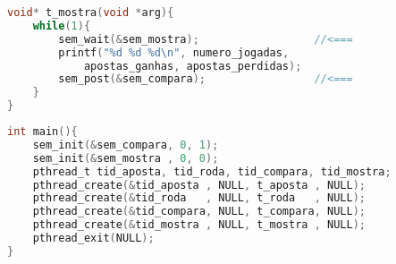 \documentclass{sope}
\begin{document}
\begin{lstlisting}[language=C]
void* t_mostra(void *arg){
    while(1){
        sem_wait(&sem_mostra);                  //<===
        printf("%d %d %d\n", numero_jogadas,
            apostas_ganhas, apostas_perdidas);
        sem_post(&sem_compara);                 //<===
    }
}
\end{lstlisting}
\begin{lstlisting}[language=C]
int main(){
    sem_init(&sem_compara, 0, 1);
    sem_init(&sem_mostra , 0, 0);
    pthread_t tid_aposta, tid_roda, tid_compara, tid_mostra;
    pthread_create(&tid_aposta , NULL, t_aposta , NULL);
    pthread_create(&tid_roda   , NULL, t_roda   , NULL);
    pthread_create(&tid_compara, NULL, t_compara, NULL);
    pthread_create(&tid_mostra , NULL, t_mostra , NULL);
    pthread_exit(NULL);
}
\end{lstlisting}
\end{document}
